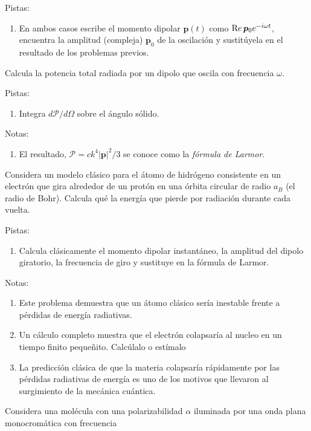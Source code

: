 \documentclass{exam}
\newenvironment{pistas}{\par\noindent Pistas:\begin{enumerate}} {\end{enumerate}}
\newenvironment{notas}{\par\noindent Notas:\begin{enumerate}} {\end{enumerate}}
\begin{document}
\begin{questions}
  \begin{pistas}
  \item En ambos casos escribe el momento dipolar $\bm p(t)$ como
    $\text Re\, \bm p_0 e^{-i\omega t}$, encuentra la amplitud
    (compleja) $\bm p_0$ de la oscilación y sustitúyela en el
    resultado de los problemas previos.
  \end{pistas}
\question \label{v} Calcula la potencia total radiada por un dipolo
  que oscila con frecuencia $\omega$.
  \begin{pistas}
  \item Integra $d\mathcal P/d\Omega$ sobre el ángulo sólido.
  \end{pistas}
  \begin{notas}
  \item El resultado, $\mathcal P=c k^4|\bm p|^2/3$ se conoce como la
    {\em fórmula de Larmor}.
  \end{notas}
\question \label{w}Considera un modelo clásico para el átomo de
  hidrógeno consistente en un electrón que gira alrededor de un protón
  en una órbita circular de radio $a_B$ (el radio de Bohr). Calcula
  qué la energía que pierde por radiación durante cada vuelta.
  \begin{pistas}
  \item Calcula clásicamente el momento dipolar instantáneo, la
    amplitud del dipolo giratorio, la frecuencia de giro y sustituye en la
    fórmula de Larmor.
  \end{pistas}
  \begin{notas}
  \item Este problema demuestra que un átomo clásico sería inestable
    frente a pérdidas de energía radiativas.
  \item Un cálculo completo muestra que el electrón colapsaría al
    nucleo en un tiempo finito pequeñito. Calcúlalo o estímalo
  \item La predicción clásica de que la materia colapsaría rápidamente
    por las pérdidas radiativas de energía es uno de los motivos que
    llevaron al surgimiento de la mecánica cuántica.
  \end{notas}
\question\label{w} Considera una molécula con una polarizabilidad
  $\alpha$ iluminada por una onda plana monocromática con frecuencia

\end{questions}
\end{document}
